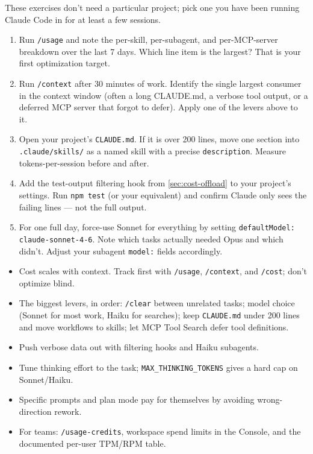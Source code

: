 \begin{exercisebox}
These exercises don't need a particular project; pick one you have been
running Claude Code in for at least a few sessions.

\begin{enumerate}
  \item Run \texttt{/usage} and note the per-skill, per-subagent, and
        per-MCP-server breakdown over the last 7 days. Which line item
        is the largest? That is your first optimization target.
  \item Run \texttt{/context} after 30 minutes of work. Identify the
        single largest consumer in the context window (often a long
        CLAUDE.md, a verbose tool output, or a deferred MCP server that
        forgot to defer). Apply one of the levers above to it.
  \item Open your project's \texttt{CLAUDE.md}. If it is over 200 lines,
        move one section into \texttt{.claude/skills/} as a named skill
        with a precise \texttt{description}. Measure tokens-per-session
        before and after.
  \item Add the test-output filtering hook from \cref{sec:cost-offload}
        to your project's settings. Run \texttt{npm test} (or your
        equivalent) and confirm Claude only sees the failing lines —
        not the full output.
  \item For one full day, force-use Sonnet for everything by setting
        \texttt{defaultModel: claude-sonnet-4-6}. Note which tasks
        actually needed Opus and which didn't. Adjust your subagent
        \texttt{model:} fields accordingly.
\end{enumerate}
\end{exercisebox}

\begin{summarybox}
\begin{itemize}
  \item Cost scales with context. Track first with \texttt{/usage},
        \texttt{/context}, and \texttt{/cost}; don't optimize blind.
  \item The biggest levers, in order: \texttt{/clear} between unrelated
        tasks; model choice (Sonnet for most work, Haiku for searches);
        keep \texttt{CLAUDE.md} under 200 lines and move workflows to
        skills; let MCP Tool Search defer tool definitions.
  \item Push verbose data out with filtering hooks and Haiku subagents.
  \item Tune thinking effort to the task; \texttt{MAX\_THINKING\_TOKENS}
        gives a hard cap on Sonnet/Haiku.
  \item Specific prompts and plan mode pay for themselves by avoiding
        wrong-direction rework.
  \item For teams: \texttt{/usage-credits}, workspace spend limits in
        the Console, and the documented per-user TPM/RPM table.
\end{itemize}
\end{summarybox}

\nocite{*}
\printbibliography[heading=subbibliography,title={References}]

